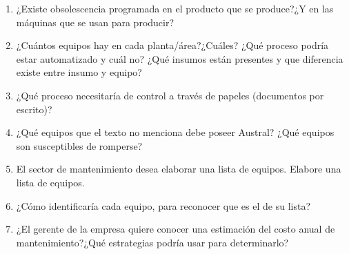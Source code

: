 \begin{enumerate}
    \item ¿Existe obsolescencia programada en el producto que se produce?¿Y en las máquinas que se usan para producir? 
    \item ¿Cuántos equipos hay en cada planta/área?¿Cuáles? ¿Qué proceso podría estar automatizado y cuál no? ¿Qué insumos están presentes y que diferencia existe entre insumo y equipo?
    \item ¿Qué proceso necesitaría de control a través de papeles (documentos por escrito)?
    \item ¿Qué equipos que el texto no menciona debe poseer Austral? ¿Qué equipos son susceptibles de romperse?
    \item El sector de mantenimiento desea elaborar una lista de equipos. Elabore una lista de equipos.
    \item ¿Cómo identificaría cada equipo, para reconocer que es el de su lista?
    \item ¿El gerente de la empresa quiere conocer una estimación del costo anual de mantenimiento?¿Qué estrategias podría usar para determinarlo?
\end{enumerate}